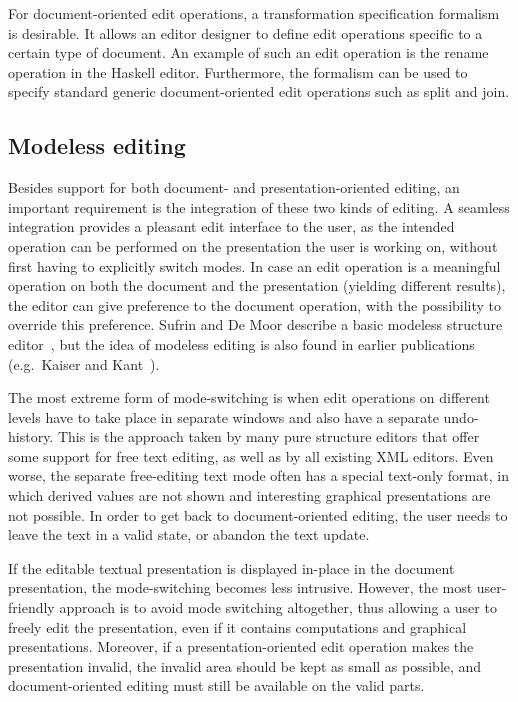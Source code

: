\documentclass{entcs}
\begin{document}
For document-oriented edit operations, a transformation specification formalism is desirable. It allows an editor designer to define edit operations specific to a certain type of document. An example of such an edit operation is the rename operation in the Haskell editor. Furthermore, the formalism can be used to specify standard generic document-oriented edit operations such as split and join.


%																
\subsection{Modeless editing}

Besides support for both document- and presentation-oriented editing, an important requirement is the integration of these two kinds of editing. A seamless integration provides a pleasant edit interface to the user, as the intended operation can be performed on the presentation the user is working on, without first having to explicitly switch modes. In case an edit operation is a meaningful operation on both the document and the presentation (yielding different results), the editor can give preference to the document operation, with the possibility to override this preference. Sufrin and De Moor describe a basic modeless structure editor~\cite{sufrin99modeless}, but the idea of modeless editing is also found in earlier publications (e.g.\ Kaiser and Kant~\cite{kaiser85parsingWithoutParser}).

The most extreme form of mode-switching is when edit operations on different levels have to take place in separate windows and also have a separate undo-history. This is the approach taken by many pure structure editors that offer some support for free text editing, as well as by all existing XML editors. Even worse, the separate free-editing text mode often has a special text-only format, in which derived values are not shown and interesting graphical presentations are not possible. In order to get back to document-oriented editing, the user needs to leave the text in a valid state, or abandon the text update.

If the editable textual presentation is displayed in-place in the document presentation, the mode-switching becomes less intrusive. However, the most user-friendly approach is to avoid mode switching altogether, thus allowing a user to freely edit the presentation, even if it contains computations and graphical presentations. Moreover, if a presentation-oriented edit operation makes the presentation invalid, the invalid area should be kept as small as possible, and document-oriented editing must still be available on the valid parts.
\end{document}
